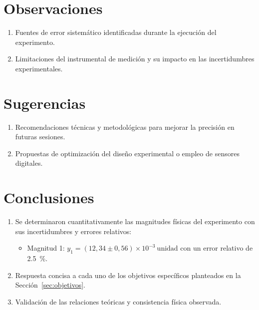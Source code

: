 
\section{Observaciones}

\begin{enumerate}
    \item Fuentes de error sistemático identificadas durante la ejecución del experimento.
    \item Limitaciones del instrumental de medición y su impacto en las incertidumbres experimentales.
\end{enumerate}

\section{Sugerencias}

\begin{enumerate}
    \item Recomendaciones técnicas y metodológicas para mejorar la precisión en futuras sesiones.
    \item Propuestas de optimización del diseño experimental o empleo de sensores digitales.
\end{enumerate}

\section{Conclusiones}
\label{sec:conclusiones}

\begin{enumerate}
    \item Se determinaron cuantitativamente las magnitudes físicas del experimento con sus incertidumbres y errores relativos:
    \begin{itemize}
        \item Magnitud 1: $y_1 = (12{,}34 \pm 0{,}56) \times 10^{-3}\ \text{unidad}$ con un error relativo de \qty{2,5}{\percent}.
    \end{itemize}
    \item Respuesta concisa a cada uno de los objetivos específicos planteados en la Sección~\ref{sec:objetivos}.
    \item Validación de las relaciones teóricas y consistencia física observada.
\end{enumerate}
